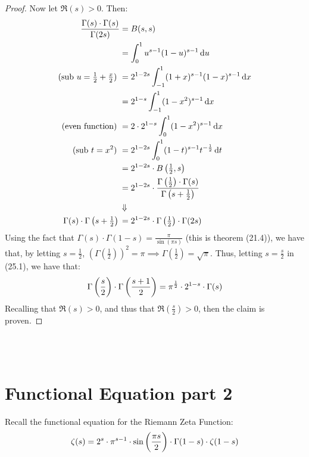 \begin{proof}
Now let $\Re(s) > 0$. Then:
\begin{align}
    \frac{\Gamma(s) \cdot \Gamma(s)}{\Gamma(2s)} &= B(s,s) \nonumber \\
    &= \int_0^1 u^{s-1} (1-u)^{s-1} \dif u \nonumber \\
    \text{(sub $u = \tfrac{1}{2}+ \tfrac{x}{2}$) } &= 2^{1-2s} \int_{-1}^1 (1+x)^{s-1} (1-x)^{s-1} \dif x \nonumber \\
    &= 2^{1-s} \int_{-1}^1 (1-x^2)^{s-1} \dif x \nonumber \\
    \text{(even function) } &= 2 \cdot 2^{1-s} \int_{0}^1 (1-x^2)^{s-1} \dif x \nonumber \\
    \text{(sub $t = x^2$) } &= 2^{1-2s} \int_0^1 (1-t)^{s-1} t^{-\frac{1}{2}} \dif t \nonumber \\
    &= 2^{1-2s} \cdot B \br{\tfrac{1}{2}, s} \nonumber \\
    &= 2^{1-2s} \cdot \frac{\Gamma\br{\tfrac{1}{2}} \cdot \Gamma(s)}{\Gamma\br{s+\tfrac{1}{2}}} \nonumber \\
    &\Downarrow \nonumber \\
    \Gamma(s) \cdot \Gamma\br{s+\tfrac{1}{2}} {} &= 2^{1-2s} \cdot \Gamma\br{\tfrac{1}{2}} \cdot  \Gamma(2s)
\end{align}
Using the fact that $\Gamma(s) \cdot \Gamma(1-s) = \tfrac{\pi}{ \sin(\pi s)}$ (this is theorem (21.4)), we have that, by letting $s = \tfrac{1}{2}$, $(\Gamma(\tfrac{1}{2}))^2 = \pi \implies \Gamma(\tfrac{1}{2}) = \sqrt{\pi}$. Thus, letting $s= \frac{s}{2}$ in (25.1), we have that:
\begin{align*}
    \Gamma\left( \frac{s}{2} \right) \cdot \Gamma\left( \frac{s+1}{2} \right) = \pi ^{\frac{1}{2}} \cdot 2^{1-s} \cdot \Gamma(s)
\end{align*}
Recalling that $\Re(s) > 0$, and thus that $\Re(\tfrac{s}{2}) > 0$, then the claim is proven.
\end{proof}\\\\





\section{Functional Equation part 2}
Recall the functional equation for the Riemann Zeta Function:
\begin{align*}
    \zeta(s) = 2^s \cdot \pi^{s-1} \cdot \sin\left( \frac{\pi s}{2} \right) \cdot \Gamma(1-s) \cdot \zeta(1-s)
\end{align*}

